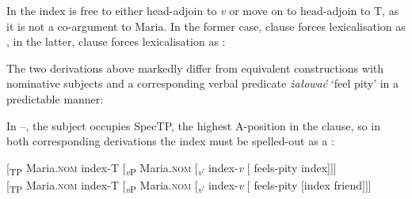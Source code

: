 \documentclass[output=paper,nonflat,colorlinks,citecolor=brown,newtxmath]{langsci/langscibook}
\begin{document}
\noindent In  the index is free to either head-adjoin to \textit{v} or move on to head-adjoin to T, as it is not a co-argument to Maria. In the former case, clause  forces lexicalisation as , in the latter, clause  forces lexicalisation as :

\ea \label{ex:witkos:35}
	\z
\z

\noindent The two derivations above markedly differ from equivalent constructions with nominative subjects and a corresponding verbal predicate \textit{żałować} ‘feel pity’ in a predictable manner:

\ea \label{ex:witkos:36}
	\z
\z

\noindent In --, the subject occupies SpecTP, the highest A-position in the clause, so in both corresponding derivations the index must be spelled-out as a :

\ea \label{ex:witkos:37}
	\ea\label{ex:witkos:37a}
    {[\textsubscript{TP} Maria.\textsc{nom} index-T [\textsubscript{\textit{v}P} Maria.\textsc{nom} [\textsubscript{\textit{v}’} index-\textit{v} [ feels-pity index]]]}\\
	\ex \label{ex:witkos:37b}
    {[\textsubscript{TP} Maria.\textsc{nom} index-T [\textsubscript{\textit{v}P} Maria.\textsc{nom} [\textsubscript{\textit{v}’} index-\textit{v} [ feels-pity [index friend]]]}\\
	\z
\z
\end{document}
